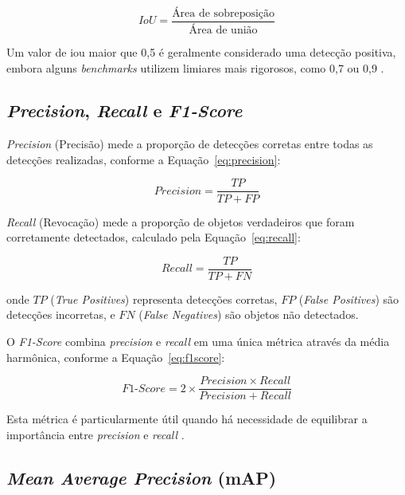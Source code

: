 \begin{equation}
\label{eq:iou}
IoU = \frac{\text{Área de sobreposição}}{\text{Área de união}}
\end{equation}

Um valor de \gls{iou} maior que 0,5 é geralmente considerado uma detecção positiva, embora alguns \textit{benchmarks} utilizem limiares mais rigorosos, como 0,7 ou 0,9 \cite{everingham2010pascal}.

\subsection*{\textit{Precision}, \textit{Recall} e \textit{F1-Score}}

\textit{Precision} (Precisão) mede a proporção de detecções corretas entre todas as detecções realizadas, conforme a Equação~\ref{eq:precision}:

\begin{equation}
\label{eq:precision}
Precision = \frac{TP}{TP + FP}
\end{equation}

\textit{Recall} (Revocação) mede a proporção de objetos verdadeiros que foram corretamente detectados, calculado pela Equação~\ref{eq:recall}:

\begin{equation}
\label{eq:recall}
Recall = \frac{TP}{TP + FN}
\end{equation}

\noindent onde $TP$ (\textit{True Positives}) representa detecções corretas, $FP$ (\textit{False Positives}) são detecções incorretas, e $FN$ (\textit{False Negatives}) são objetos não detectados.

O \textit{F1-Score} combina \textit{precision} e \textit{recall} em uma única métrica através da média harmônica, conforme a Equação~\ref{eq:f1score}:

\begin{equation}
\label{eq:f1score}
F1\text{-}Score = 2 \times \frac{Precision \times Recall}{Precision + Recall}
\end{equation}

Esta métrica é particularmente útil quando há necessidade de equilibrar a importância entre \textit{precision} e \textit{recall} \cite{powers2011evaluation}.

\subsection*{\textit{Mean Average Precision} (mAP)}

